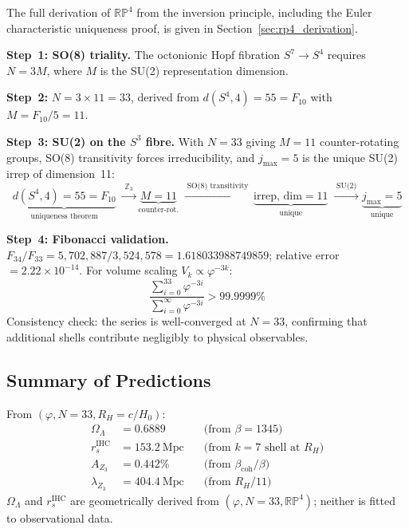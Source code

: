 \documentclass[12pt,a4paper]{article}
\begin{document}
The full derivation of $\mathbb{RP}^4$ from the inversion principle, including
the Euler characteristic uniqueness proof, is given in Section~\ref{sec:rp4_derivation}.

\textbf{Step~1: SO(8) triality.} The octonionic Hopf fibration $S^7 \to S^4$ requires
$N = 3M$, where $M$ is the SU(2) representation dimension.

\textbf{Step~2:} $N = 3 \times 11 = 33$, derived from $d(S^4,4) = 55 = F_{10}$
with $M = F_{10}/5 = 11$.

\textbf{Step~3: SU(2) on the $S^3$ fibre.}
With $N = 33$ giving $M = 11$ counter-rotating groups, SO(8) transitivity forces
irreducibility, and $j_\mathrm{max} = 5$ is the unique SU(2) irrep of dimension~11:
\begin{equation}
  \underbrace{d(S^4,4)=55=F_{10}}_{\text{uniqueness theorem}} \;\xrightarrow{\;\mathbb{Z}_3\;}
  \underbrace{M=11}_{\text{counter-rot.}} \;\xrightarrow{\;\text{SO(8) transitivity}\;}
  \underbrace{\text{irrep, dim}=11}_{\text{unique}} \;\xrightarrow{\;\text{SU(2)}\;}
  \underbrace{j_\mathrm{max}=5}_{\text{unique}}
\end{equation}

\textbf{Step~4: Fibonacci validation.}
{\small $F_{34}/F_{33} = 5{,}702{,}887/3{,}524{,}578 = 1.618033988749859$};
relative error $= 2.22 \times 10^{-14}$.
For volume scaling $V_k \propto \varphi^{-3k}$:
\begin{equation*}
  \frac{\displaystyle\sum_{i=0}^{33}\varphi^{-3i}}
       {\displaystyle\sum_{i=0}^{\infty}\varphi^{-3i}} > 99.9999\%
\end{equation*}
Consistency check: the series is well-converged at $N = 33$, confirming that
additional shells contribute negligibly to physical observables.

\subsection{Summary of Predictions}

From $(\varphi, N = 33, R_H = c/H_0)$:
\begin{align}
  \Omega_\Lambda &= 0.6889 \quad &\text{(from } \beta = 1345\text{)} \\
  r_s^\mathrm{IHC} &= 153.2~\mathrm{Mpc} \quad &\text{(from } k = 7\text{ shell at } R_H\text{)} \\
  A_{Z_3} &= 0.442\% \quad &\text{(from } \beta_\mathrm{coh}/\beta\text{)} \\
  \lambda_{Z_3} &= 404.4~\mathrm{Mpc} \quad &\text{(from } R_H/11\text{)}
\end{align}
$\Omega_\Lambda$ and $r_s^\mathrm{IHC}$ are geometrically derived from $(\varphi, N=33, \mathbb{RP}^4)$; neither is fitted to observational data.
\end{document}
